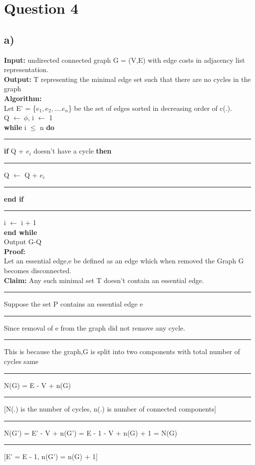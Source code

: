 \documentclass{report}
\begin{document}
 \section*{Question 4}
 \subsection*{a)}
 \textbf{Input:}  undirected connected graph G = (V,E) with edge costs in adjacency list representation.\\
 \textbf{Output:} T representing the minimal edge set such that there are no cycles in the graph\\
 \textbf{Algorithm:}\\
 Let E' = \{$e_1,e_2,....e_n$\} be the set of edges sorted in decreasing order of c(.).\\
 Q $\leftarrow \ \phi$, i $\leftarrow$ 1\\
 \textbf{while} i $\leq$ n \textbf{do}\\
 \noindent\rule[0.5mm]{0.5cm}{0pt} \textbf{if} Q + $e_i$ doesn't have a cycle \textbf{then}\\
 \noindent\rule[0.5mm]{1cm}{0pt} Q $\leftarrow$ Q + $e_i$\\
 \noindent\rule[0.5mm]{0.5cm}{0pt} \textbf{end if}\\
 \noindent\rule[0.5mm]{0.5cm}{0pt} i $\leftarrow$ i + 1\\
 \textbf{end while}\\
 Output G-Q
 \vspace*{0.5em}\\
 \textbf{Proof:}\\
 Let an essential edge,e be defined as an edge which when removed the Graph G becomes disconnected.\\
 \textbf{Claim:} Any such minimal set T doesn't contain an essential edge.\\
 \noindent\rule[0.5mm]{1cm}{0pt} Suppose the set P contains an essential edge e\\
 \noindent\rule[0.5mm]{1cm}{0pt} Since removal of e from the graph did not remove any cycle.\\
 \noindent\rule[0.5mm]{1cm}{0pt} This is because the graph,G is split into two components with total number of cycles same\\
 \noindent\rule[0.5mm]{1cm}{0pt} N(G) = E - V + n(G) \noindent\rule[0.5mm]{1cm}{0pt} [N(.) is the number of cycles, n(.) is number of connected components]
 \noindent\rule[0.5mm]{1cm}{0pt} N(G') = E' - V + n(G') = E - 1 - V + n(G) + 1 = N(G)\noindent\rule[0.5mm]{1cm}{0pt} [E' = E - 1, n(G') = n(G) + 1] \\
\end{document}
